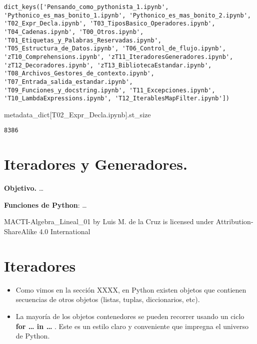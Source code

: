 \documentclass[
  letterpaper,
  DIV=11,
  numbers=noendperiod]{scrreprt}
\newenvironment{Shaded}{\begin{snugshade}}{\end{snugshade}}
\newcommand{\NormalTok}[1]{\textcolor[rgb]{0.00,0.23,0.31}{#1}}
\newcommand{\StringTok}[1]{\textcolor[rgb]{0.13,0.47,0.30}{#1}}
\begin{document}
\begin{verbatim}
dict_keys(['Pensando_como_pythonista_1.ipynb', 'Pythonico_es_mas_bonito_1.ipynb', 'Pythonico_es_mas_bonito_2.ipynb', 'T02_Expr_Decla.ipynb', 'T03_TiposBasico_Operadores.ipynb', 'T04_Cadenas.ipynb', 'T00_Otros.ipynb', 'T01_Etiquetas_y_Palabras_Reservadas.ipynb', 'T05_Estructura_de_Datos.ipynb', 'T06_Control_de_flujo.ipynb', 'zT10_Comprehensions.ipynb', 'zT11_IteradoresGeneradores.ipynb', 'zT12_Decoradores.ipynb', 'zT13_BibliotecaEstandar.ipynb', 'T08_Archivos_Gestores_de_contexto.ipynb', 'T07_Entrada_salida_estandar.ipynb', 'T09_Funciones_y_docstring.ipynb', 'T11_Excepciones.ipynb', 'T10_LambdaExpressions.ipynb', 'T12_IterablesMapFilter.ipynb'])
\end{verbatim}

\begin{Shaded}
\begin{Highlighting}[]
\NormalTok{metadata\_dict[}\StringTok{\textquotesingle{}T02\_Expr\_Decla.ipynb\textquotesingle{}}\NormalTok{].st\_size}
\end{Highlighting}
\end{Shaded}

\begin{verbatim}
8386
\end{verbatim}


\chapter{Iteradores y Generadores.}\label{iteradores-y-generadores.}

\textbf{Objetivo.} \ldots{}

\textbf{Funciones de Python}: \ldots{}

MACTI-Algebra\_Lineal\_01 by Luis M. de la Cruz is licensed under
Attribution-ShareAlike 4.0 International


\chapter{Iteradores}\label{iteradores}

\begin{itemize}
\item
  Como vimos en la sección XXXX, en Python existen objetos que contienen
  secuencias de otros objetos (listas, tuplas, diccionarios, etc).
\item
  La mayoría de los objetos contenedores se pueden recorrer usando un
  ciclo \textbf{for \ldots{} in \ldots{}} . Este es un estilo claro y
  conveniente que impregna el universo de Python.
\end{itemize}
\end{document}

